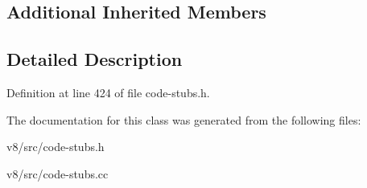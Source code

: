 \subsection*{Additional Inherited Members}


\subsection{Detailed Description}


Definition at line 424 of file code-\/stubs.\+h.



The documentation for this class was generated from the following files\+:\begin{DoxyCompactItemize}
\item 
v8/src/code-\/stubs.\+h\item 
v8/src/code-\/stubs.\+cc\end{DoxyCompactItemize}
